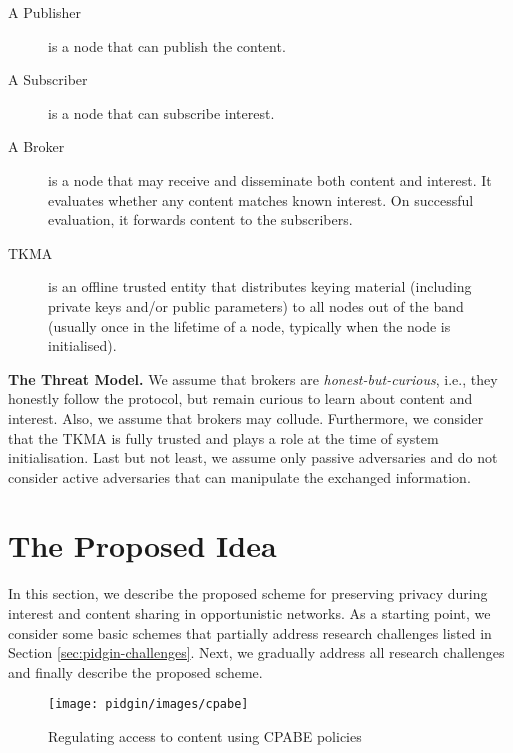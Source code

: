 \documentclass[epsfig,a4paper,11pt,titlepage]{book}
\numberwithin{algorithm}{chapter}
\begin{document}
\begin{description}

	\item [A Publisher] is a node that can publish the content.
	
	\item [A Subscriber] is a node that can subscribe interest.
	
	\item [A Broker] is a node that may receive and disseminate both content and interest. It evaluates whether any content matches known interest. On successful evaluation, it forwards content to the subscribers.
	
	\item [\acrfull{TKMA}] is an offline trusted entity that distributes keying material (including private keys and/or public parameters) to all nodes out of the band (usually once in the lifetime of a node, typically when the node is initialised).
	
\end{description}

\noindent \textbf{The Threat Model.} We assume that brokers are \textit{honest-but-curious}, i.e., they honestly follow the protocol, but remain curious to learn about content and interest. Also, we assume that brokers may collude. Furthermore, we consider that the \gls{TKMA} is fully trusted and plays a role at the time of system initialisation. Last but not least, we assume only passive adversaries and do not consider active adversaries that can manipulate the exchanged information.

\section{The Proposed Idea}
\label{sec:pidgin-proposed-scheme}
In this section, we describe the proposed scheme for preserving privacy during interest and content sharing in opportunistic networks. As a starting point, we consider some basic schemes that partially address research challenges listed in Section \ref{sec:pidgin-challenges}. Next, we gradually address all research challenges and finally describe the proposed scheme.

\begin{figure} [htp]
\centering
\texttt{[image: pidgin/images/cpabe]}
\caption[Regulating access to content using CPABE policies]{Regulating access to content using \gls{CPABE} policies}
\label{fig:pidgin-cpabe}
\end{figure}
\end{document}
